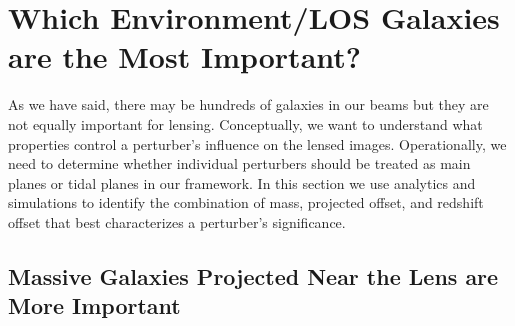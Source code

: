 \documentclass{emulateapj}
\begin{document}
\section{Which Environment/LOS Galaxies are the Most Important?}
\label{sec:Individual}

As we have said, there may be hundreds of galaxies in our beams but they are not equally important for lensing.  Conceptually, we want to understand what properties control a perturber's influence on the lensed images.  Operationally, we need to determine whether individual perturbers should be treated as main planes or tidal planes in our framework.  In this section we use analytics and simulations to identify the combination of mass, projected offset, and redshift offset that best characterizes a perturber's significance.

\subsection{Massive Galaxies Projected Near the Lens are More Important}
\end{document}
